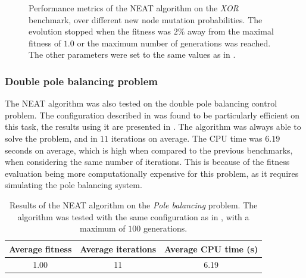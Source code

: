 \begin{figure}
\begin{center}
    \end{center}
    \caption{Performance metrics of the NEAT algorithm on the \textit{XOR} benchmark, over different new node mutation probabilities.
    The evolution stopped when the fitness was $2\%$ away from the maximal fitness of $1.0$ or the maximum number of generations was reached.
    The other parameters were set to the same values as in \cite{neat}.}
    \label{fig:neat_xor_probabilities}
\end{figure}

\subsubsection{Double pole balancing problem}

The NEAT algorithm was also tested on the double pole balancing control problem.
The configuration described in \cite{neat} was found to be particularly efficient on this task, the results using it are presented in .
The algorithm was always able to solve the problem, and in $11$ iterations on average. The CPU time was $6.19$ seconds on average, which is high when compared to the previous benchmarks,
when considering the same number of iterations. This is because of the fitness evaluation being more computationally expensive for this problem, as it requires simulating the pole balancing
system.

\begin{table}
    \caption{Results of the NEAT algorithm on the \textit{Pole balancing} problem. The algorithm was tested with the same configuration as in \cite{neat}, with a maximum of $100$ generations.}
    \centering
    \label{tab:nneat_pole}
    \begin{tabular}{ |c|c|c| }
        \hline
        Average fitness & Average iterations & Average CPU time (s) \\
        \hline
        1.00 & 11 & 6.19 \\
        \hline\hline
    \end{tabular}
\end{table}

